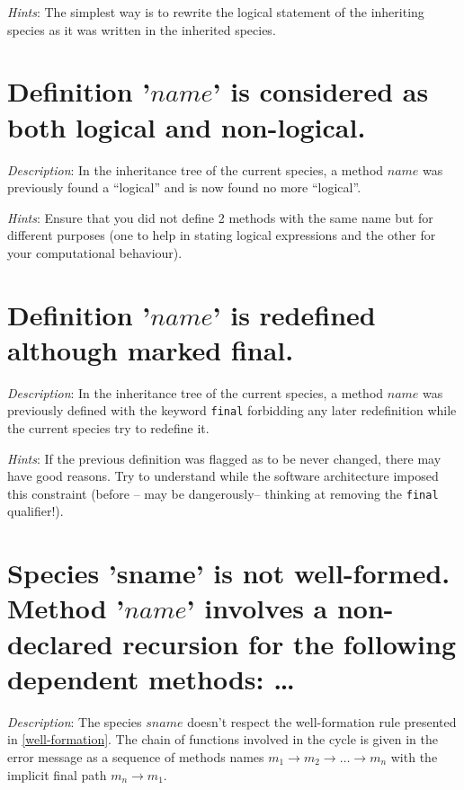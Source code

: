 {\em Hints}: The simplest way is to rewrite the logical statement of
the inheriting species as it was written in the inherited species.



\section*{Definition '$name$' is considered as both  logical and
  non-logical.}

{\em Description}: In the inheritance tree of the current species, a
method $name$ was previously found a ``logical'' and is now found no
more ``logical''.

{\em Hints}: Ensure that you did not define 2 methods with the same
name but for different purposes (one to help in stating logical
expressions and the other for your computational behaviour).



\section*{Definition '$name$' is redefined although marked final.}

{\em Description}: In the inheritance tree of the current species, a
method $name$ was previously defined with the keyword {\tt final} forbidding
any later redefinition while the current species try to redefine it.

{\em Hints}: If the previous definition was flagged as to be never changed,
there may have good reasons. Try to understand while the software architecture
imposed this constraint (before -- may be dangerously-- thinking at removing the
{\tt final} qualifier!).


\section*{Species 'sname' is not well-formed. Method  '$name$' involves
  a non-declared recursion for the following dependent methods: \ldots}

{\em Description}: The species $sname$ doesn't respect the
well-formation rule presented in \ref{well-formation}. The chain of
functions involved in the cycle is given in the error message as a
sequence of methods names
$m_1 \rightarrow m_2 \rightarrow \ldots \rightarrow m_n$ with the
implicit final path $m_n \rightarrow m_1$.

